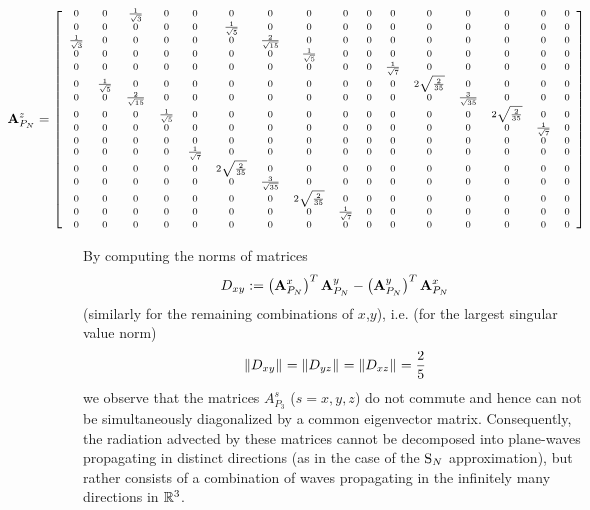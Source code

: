 $$
\scriptsize
\hspace*{-2cm}
\mat{A}_{P_N}^z =
\left[
\begin{array}{cccccccccccccccc}
 0 & 0 & \frac{1}{\sqrt{3}} & 0 & 0 & 0 & 0 & 0 & 0 & 0 & 0 & 0 & 0 & 0 & 0 & 0 \\
 0 & 0 & 0 & 0 & 0 & \frac{1}{\sqrt{5}} & 0 & 0 & 0 & 0 & 0 & 0 & 0 & 0 & 0 & 0 \\
 \frac{1}{\sqrt{3}} & 0 & 0 & 0 & 0 & 0 & \frac{2}{\sqrt{15}} & 0 & 0 & 0 & 0 & 0 & 0 & 0 & 0 & 0 \\
 0 & 0 & 0 & 0 & 0 & 0 & 0 & \frac{1}{\sqrt{5}} & 0 & 0 & 0 & 0 & 0 & 0 & 0 & 0 \\
 0 & 0 & 0 & 0 & 0 & 0 & 0 & 0 & 0 & 0 & \frac{1}{\sqrt{7}} & 0 & 0 & 0 & 0 & 0 \\
 0 & \frac{1}{\sqrt{5}} & 0 & 0 & 0 & 0 & 0 & 0 & 0 & 0 & 0 & 2 \sqrt{\frac{2}{35}} & 0 & 0 & 0 & 0 \\
 0 & 0 & \frac{2}{\sqrt{15}} & 0 & 0 & 0 & 0 & 0 & 0 & 0 & 0 & 0 & \frac{3}{\sqrt{35}} & 0 & 0 & 0 \\
 0 & 0 & 0 & \frac{1}{\sqrt{5}} & 0 & 0 & 0 & 0 & 0 & 0 & 0 & 0 & 0 & 2 \sqrt{\frac{2}{35}} & 0 & 0 \\
 0 & 0 & 0 & 0 & 0 & 0 & 0 & 0 & 0 & 0 & 0 & 0 & 0 & 0 & \frac{1}{\sqrt{7}} & 0 \\
 0 & 0 & 0 & 0 & 0 & 0 & 0 & 0 & 0 & 0 & 0 & 0 & 0 & 0 & 0 & 0 \\
 0 & 0 & 0 & 0 & \frac{1}{\sqrt{7}} & 0 & 0 & 0 & 0 & 0 & 0 & 0 & 0 & 0 & 0 & 0 \\
 0 & 0 & 0 & 0 & 0 & 2 \sqrt{\frac{2}{35}} & 0 & 0 & 0 & 0 & 0 & 0 & 0 & 0 & 0 & 0 \\
 0 & 0 & 0 & 0 & 0 & 0 & \frac{3}{\sqrt{35}} & 0 & 0 & 0 & 0 & 0 & 0 & 0 & 0 & 0 \\
 0 & 0 & 0 & 0 & 0 & 0 & 0 & 2 \sqrt{\frac{2}{35}} & 0 & 0 & 0 & 0 & 0 & 0 & 0 & 0 \\
 0 & 0 & 0 & 0 & 0 & 0 & 0 & 0 & \frac{1}{\sqrt{7}} & 0 & 0 & 0 & 0 & 0 & 0 & 0 \\
 0 & 0 & 0 & 0 & 0 & 0 & 0 & 0 & 0 & 0 & 0 & 0 & 0 & 0 & 0 & 0 \\
\end{array}
\right]
$$

By computing the norms of matrices
$$
D_{xy} := \left(\mat{A}_{P_N}^x\right)^T \mat{A}_{P_N}^y - \left(\mat{A}_{P_N}^y\right)^T \mat{A}_{P_N}^x
$$
(similarly for the remaining combinations of $x$,$y$), i.e. (for the largest singular value norm)
$$
	\norm{D_{xy}} = \norm{D_{yz}} = \norm{D_{xz}} = \frac{2}{5}
$$
we observe that the matrices
$A_{P_3}^s$ ($s = x,y,z$) do not commute and hence can not be simultaneously 
diagonalized by a common eigenvector matrix. Consequently, the radiation advected by these matrices cannot be decomposed into plane-waves propagating in distinct directions (as in 
the case of the $\SN$ approximation), but rather consists of a combination of waves propagating in the infinitely many 
directions in $\R[3]$.

